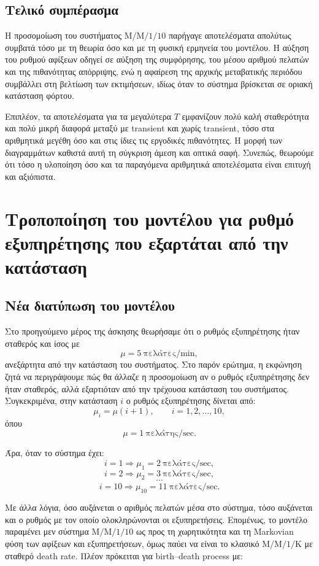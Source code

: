 \documentclass{article}
\begin{document}
\subsection{Τελικό συμπέρασμα}

Η προσομοίωση του συστήματος $\mathrm{M/M/1/10}$ παρήγαγε αποτελέσματα απολύτως συμβατά τόσο με τη θεωρία όσο και με τη φυσική ερμηνεία του μοντέλου. Η αύξηση του ρυθμού αφίξεων οδηγεί σε αύξηση της συμφόρησης, του μέσου αριθμού πελατών και της πιθανότητας απόρριψης, ενώ η αφαίρεση της αρχικής μεταβατικής περιόδου συμβάλλει στη βελτίωση των εκτιμήσεων, ιδίως όταν το σύστημα βρίσκεται σε οριακή κατάσταση φόρτου.

Επιπλέον, τα αποτελέσματα για τα μεγαλύτερα $T$ εμφανίζουν πολύ καλή σταθερότητα και πολύ μικρή διαφορά μεταξύ με transient και χωρίς transient, τόσο στα αριθμητικά μεγέθη όσο και στις ίδιες τις εργοδικές πιθανότητες. Η μορφή των διαγραμμάτων καθιστά αυτή τη σύγκριση άμεση και οπτικά σαφή. Συνεπώς, θεωρούμε ότι τόσο η υλοποίηση όσο και τα παραγόμενα αριθμητικά αποτελέσματα είναι επιτυχή και αξιόπιστα.

\newpage
\section{Τροποποίηση του μοντέλου για ρυθμό εξυπηρέτησης που εξαρτάται από την κατάσταση}

\subsection{Νέα διατύπωση του μοντέλου}

Στο προηγούμενο μέρος της άσκησης θεωρήσαμε ότι ο ρυθμός εξυπηρέτησης ήταν σταθερός και ίσος με
\[
\mu = 5 \ \text{πελάτες/min},
\]
ανεξάρτητα από την κατάσταση του συστήματος. Στο παρόν ερώτημα, η εκφώνηση ζητά να περιγράψουμε πώς θα άλλαζε η προσομοίωση αν ο ρυθμός εξυπηρέτησης δεν ήταν σταθερός, αλλά εξαρτιόταν από την τρέχουσα κατάσταση του συστήματος. Συγκεκριμένα, στην κατάσταση $i$ ο ρυθμός εξυπηρέτησης δίνεται από:
\[
\mu_i = \mu(i+1), \qquad i=1,2,\ldots,10,
\]
όπου
\[
\mu = 1 \ \text{πελάτης/sec}.
\]

Άρα, όταν το σύστημα έχει:
\[
i=1 \Rightarrow \mu_1 = 2 \ \text{πελάτες/sec},
\]
\[
i=2 \Rightarrow \mu_2 = 3 \ \text{πελάτες/sec},
\]
\[
\cdots
\]
\[
i=10 \Rightarrow \mu_{10} = 11 \ \text{πελάτες/sec}.
\]

Με άλλα λόγια, όσο αυξάνεται ο αριθμός πελατών μέσα στο σύστημα, τόσο αυξάνεται και ο ρυθμός με τον οποίο ολοκληρώνονται οι εξυπηρετήσεις. Επομένως, το μοντέλο παραμένει μεν σύστημα $\mathrm{M/M/1/10}$ ως προς τη χωρητικότητα και τη Markovian φύση των αφίξεων και εξυπηρετήσεων, όμως παύει να είναι το κλασικό $\mathrm{M/M/1/K}$ με σταθερό death rate. Πλέον πρόκειται για birth--death process με:
\end{document}
